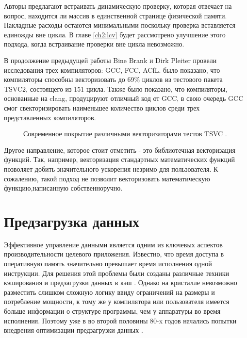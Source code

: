 Авторы предлагают встраивать динамическую проверку, которая  отвечает на вопрос, находится ли массив в единственной странице физической памяти. Накладные расходы остаются минимальными поскольку проверка вставляется единожды вне цикла. В главе \ref{ch2:lcv} будет рассмотрено улучшение этого подхода, когда встраивание проверки вне цикла невозможно.
 
В продолжение предыдущей работы Bine Brank и Dirk Pleiter \cite{brank2022assessing} провели исследования трех компиляторов: GCC, FCC, ACfL. было показано, что компиляторы способны векторизовать до 69\% циклов из тестового пакета TSVC2, состоящего из 151 цикла. Также было показано, что компиляторы, основанные на clang, продуцируют отличный код от GCC, в свою очередь GCC смог свекторизировать наименьшее количество циклов среди трех представленных компиляторов.
 \begin{figure}[htbp]
 	\centering
 	
 	\caption{Современное покрытие различными векторизаторами тестов TSVC \cite{brank2022assessing}.}
 	\label{partReview:vectorization}
 \end{figure}
 
Другое направление, которое стоит отметить - это библиотечная векторизация функций. Так, например, векторизация стандартных  математических функций \cite{petrogalli2018llvm} позволяет добить значительного ускорения незримо для пользователя. К сожалению, такой подход не позволит векторизовать математическую функцию,написанную собственноручно.
 
 
\section{Предзагрузка данных} \label{pr:prefetch}
Эффективное управление данными является одним из ключевых аспектов производительности целевого приложения. Известно, что время доступа в оперативную память значительно превышает время исполнения одной инструкции. Для решения этой проблемы были созданы различные техники кэширования и предзагрузки данных в кэш \cite{smith1987design, tse1998cpu}.  Однако на кристалле невозможно разместить слишком сложную логику ввиду ограничений на размеры и потребление мощности, к тому же у компилятора или пользователя имеется больше информации о структуре программы, чем у аппаратуры во время исполнения. Поэтому уже в во второй половины 80-x годов начались попытки внедрения оптимизации предзагрузки данных \cite{lee1987effectiveness}. 

